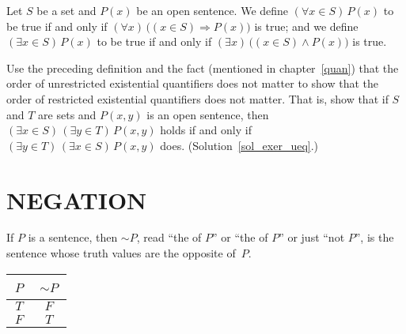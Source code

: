 \begin{defn}
Let $S$ be a set and $P(x)$ be an open sentence. We define $(\forall x \in S)\,P(x)$ to be
true if and only if $(\forall x)\,\bigl((x \in S) \Rightarrow P(x)\bigr)$ is true; and we
define $(\exists x \in S)\,P(x)$ to be true if and only if $(\exists x)\, \bigl((x \in S)
\land P(x)\bigr)$ is true.
\end{defn}

\begin{exer}\label{exer_ueq} Use the preceding definition and the fact (mentioned in
chapter~\ref{quan}) that the order of unrestricted existential quantifiers does not matter to
show that the order of restricted existential quantifiers does not matter. That is, show that
if $S$ and $T$ are sets and $P(x,y)$ is an open sentence, then $(\exists x \in S)\,(\exists y
\in T)\, P(x,y)$ holds if and only if $(\exists y \in T)\,(\exists x \in S)\, P(x,y)$ does.
(Solution~\ref{sol_exer_ueq}.)
\end{exer}






\section{NEGATION}\label{neg} If $P$ is a sentence,
then $\sim P$, read ``the
 of $P$'' or ``the
 of $P$'' or just ``not $P$'', is the sentence whose truth values are the opposite
of~$P$.
 \begin{center}
  \begin{tabular}{|c||c|}\hline
        \,$P$\,    &    \,$\sim P$\,  \\
    \hline\hline
          $T$      &        $F$       \\
    \hline
          $F$      &        $T$       \\
    \hline
  \end{tabular}
 \end{center}

